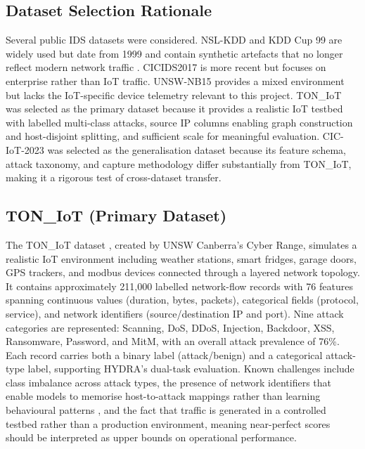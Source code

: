 \documentclass[12pt,a4paper]{report}
\begin{document}
\subsection{Dataset Selection Rationale}
\label{sec:dataset-rationale}

Several public IDS datasets were considered. NSL-KDD and KDD Cup 99 are widely used but date from 1999 and contain synthetic artefacts that no longer reflect modern network traffic \cite{aldweesh2020}. CICIDS2017 is more recent but focuses on enterprise rather than IoT traffic. UNSW-NB15 provides a mixed environment but lacks the IoT-specific device telemetry relevant to this project. TON\_IoT was selected as the primary dataset because it provides a realistic IoT testbed with labelled multi-class attacks, source IP columns enabling graph construction and host-disjoint splitting, and sufficient scale for meaningful evaluation. CIC-IoT-2023 was selected as the generalisation dataset because its feature schema, attack taxonomy, and capture methodology differ substantially from TON\_IoT, making it a rigorous test of cross-dataset transfer.

\subsection{TON\_IoT (Primary Dataset)}
\label{sec:toniot}

The TON\_IoT dataset \cite{moustafa2021}, created by UNSW Canberra's Cyber Range, simulates a realistic IoT environment including weather stations, smart fridges, garage doors, GPS trackers, and modbus devices connected through a layered network topology. It contains approximately 211,000 labelled network-flow records with 76 features spanning continuous values (duration, bytes, packets), categorical fields (protocol, service), and network identifiers (source/destination IP and port). Nine attack categories are represented: Scanning, DoS, DDoS, Injection, Backdoor, XSS, Ransomware, Password, and MitM, with an overall attack prevalence of 76\%. Each record carries both a binary label (attack/benign) and a categorical attack-type label, supporting HYDRA's dual-task evaluation. Known challenges include class imbalance across attack types, the presence of network identifiers that enable models to memorise host-to-attack mappings rather than learning behavioural patterns \cite{ogunseyi2026}, and the fact that traffic is generated in a controlled testbed rather than a production environment, meaning near-perfect scores should be interpreted as upper bounds on operational performance.
\end{document}
